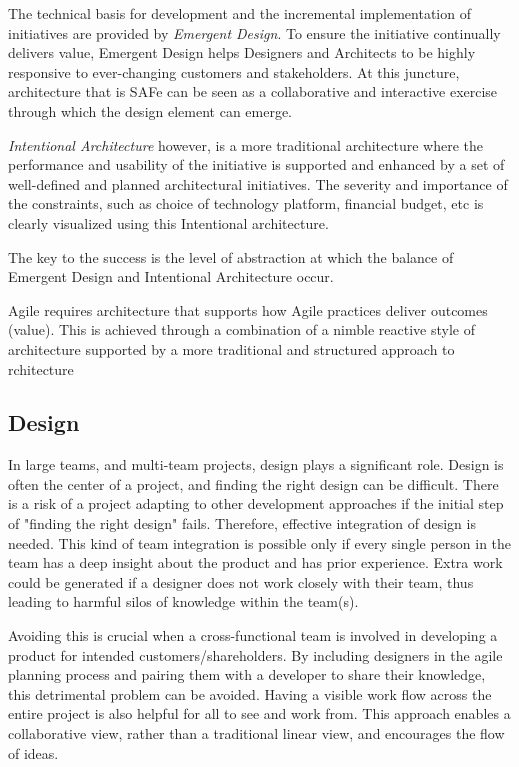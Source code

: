 \documentclass[sigplan,screen]{acmart}
\begin{document}
The technical basis for development and the incremental implementation of initiatives are provided by \textit{Emergent Design}. To ensure the initiative continually delivers value, Emergent Design helps Designers and Architects to be highly responsive to ever-changing customers and stakeholders. At this juncture, architecture that is SAFe can be seen as a collaborative and interactive exercise through which the design element can emerge. 

\textit{Intentional Architecture} however, is a more traditional architecture where the performance and usability of the initiative is supported and enhanced by a set of well-defined and planned architectural initiatives. The severity and importance of the constraints, such as choice of technology platform, financial budget, etc is clearly visualized using this Intentional architecture.

The key to the success is the level of abstraction at which the balance of Emergent Design and Intentional Architecture occur. 

Agile requires architecture that supports how Agile practices deliver outcomes (value). This is achieved through a combination of a nimble reactive style of architecture supported by a more traditional and structured approach to rchitecture \cite{EnterpriseArch}
\subsection{Design}
In large teams, and multi-team projects, design plays a significant role. Design is often the center of a project, and finding the right design can be difficult. There is a risk of a project adapting to other development approaches if the initial step of "finding the right design" fails. Therefore, effective integration of design is needed. This kind of team integration is possible only if every single person in the team has a deep insight about the product and has prior experience. Extra work could be generated if a designer does not work closely with their team, thus leading to harmful silos of knowledge within the team(s). \cite{AgileDesignPrac}

Avoiding this is crucial when a cross-functional team is involved in developing a product for intended customers/shareholders. By including designers in the agile planning process and pairing them with a developer to share their knowledge, this detrimental problem can be avoided. Having a visible work flow across the entire project is also helpful for all to see and work from. This approach enables a collaborative view, rather than a traditional linear view, and encourages the flow of ideas. 
\end{document}
